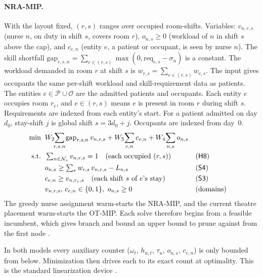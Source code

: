 \documentclass[11pt]{article}
\newcommand{\Sc}[1]{\textsf{S#1}}
\newcommand{\Hc}[1]{\textsf{H#1}}
\begin{document}
	\paragraph{NRA-MIP.} With the layout fixed, $(r,s)$ ranges over occupied room-shifts. Variables:
	$v_{n,r,s}$ (nurse $n$, on duty in shift $s$, covers room $r$), $o_{n,s}\ge 0$ (workload of $n$ in
	shift $s$ above the cap), and $c_{e,n}$ (entity $e$, a patient or occupant, is seen by nurse $n$).
	The skill shortfall $\mathrm{gap}_{r,s,n}=\sum_{e\in(r,s)}\max(0,\mathrm{req}_{e,s}-\sigma_n)$ is a constant. The workload demanded in room $r$ at shift $s$ is $w_{r,s}=\sum_{e\in(r,s)}w_{e,s}$. The input gives occupants the same per-shift workload and skill-requirement data as patients.
	The entities $e\in\mathcal P\cup\mathcal O$ are the admitted patients and occupants. Each entity $e$ occupies room $r_e$, and $e\in(r,s)$ means $e$ is present in room $r$ during shift $s$. Requirements are indexed from each entity's start. For a patient admitted on day $d_0$, stay-shift $j$ is global shift $s=3d_0+j$. Occupants are indexed from day~0.
	{\small
		\begin{align*}
			\min\;\; & W_2\!\!\sum_{r,s,n}\!\mathrm{gap}_{r,s,n}\,v_{n,r,s}
			+ W_3\!\sum_{e,n} c_{e,n} + W_4\!\sum_{n,s} o_{n,s}\\
			\text{s.t.}\;\;
			& \textstyle\sum_{n\in\mathcal N_s} v_{n,r,s}=1 \quad(\text{each occupied }(r,s)) && \text{(\Hc8)}\\
			& o_{n,s}\ge \textstyle\sum_r w_{r,s}\,v_{n,r,s} - L_{n,s} && \text{(\Sc4)}\\
			& c_{e,n}\ge v_{n,r_e,s}\quad(\text{each shift }s\text{ of }e\text{'s stay}) && \text{(\Sc3)}\\
				& v_{n,r,s},\,c_{e,n}\in\{0,1\},\ o_{n,s}\ge 0 && \text{(domains)}
	\end{align*}}%
	The greedy nurse assignment warm-starts the NRA-MIP, and the current theatre placement warm-starts the OT-MIP. Each solve therefore begins from a feasible incumbent, which gives branch and bound an upper bound to prune against from the first node \citep{wolsey1998}.
	
	In both models every auxiliary counter ($\omega_t$, $h_{u,t}$, $\tau_u$, $o_{n,s}$, $c_{e,n}$) is only bounded from below. Minimization then drives each to its exact count at optimality. This is the standard linearization device \citep{wolsey1998}.
\end{document}
